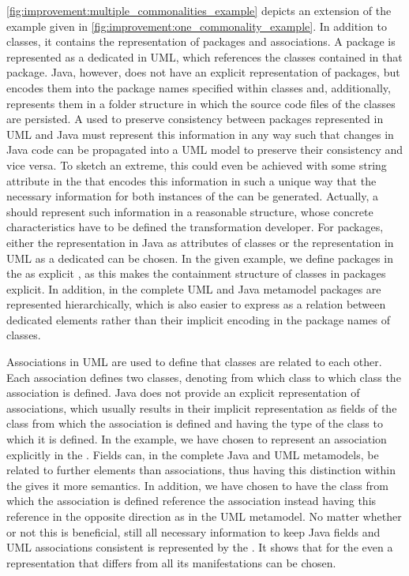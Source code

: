 \autoref{fig:improvement:multiple_commonalities_example} depicts an extension of the example given in \autoref{fig:improvement:one_commonality_example}.
In addition to classes, it contains the representation of packages and associations.
A package is represented as a dedicated \metaclass in \gls{UML}, which references the classes contained in that package.
Java, however, does not have an explicit representation of packages, but encodes them into the package names specified within classes and, additionally, represents them in a folder structure in which the source code files of the classes are persisted.
A \conceptmetamodel used to preserve consistency between packages represented in \gls{UML} and Java must represent this information in any way such that changes in Java code can be propagated into a \gls{UML} model to preserve their consistency and vice versa.
To sketch an extreme, this could even be achieved with some string attribute in the \conceptmetamodel that encodes this information in such a unique way that the necessary information for both instances of the \concretemetamodels can be generated.
Actually, a \conceptmetamodel should represent such information in a reasonable structure, whose concrete characteristics have to be defined the transformation developer.
For packages, either the representation in Java as attributes of classes or the representation in \gls{UML} as a dedicated \metaclass can be chosen.
In the given example, we define packages in the \conceptmetamodel as explicit \metaclasses, as this makes the containment structure of classes in packages explicit.
In addition, in the complete \gls{UML} and Java metamodel packages are represented hierarchically, which is also easier to express as a relation between dedicated elements rather than their implicit encoding in the package names of classes.

Associations in \gls{UML} are used to define that classes are related to each other.
Each association defines two classes, denoting from which class to which class the association is defined.
Java does not provide an explicit representation of associations, which usually results in their implicit representation as fields of the class from which the association is defined and having the type of the class to which it is defined.
In the example, we have chosen to represent an association explicitly in the \conceptmetamodel.
Fields can, in the complete Java and \gls{UML} metamodels, be related to further elements than associations, thus having this distinction within the \conceptmetamodel gives it more semantics.
In addition, we have chosen to have the class from which the association is defined reference the association instead having this reference in the opposite direction as in the \gls{UML} metamodel.
No matter whether or not this is beneficial, still all necessary information to keep Java fields and \gls{UML} associations consistent is represented by the \conceptmetamodel.
It shows that for the \conceptmetamodel even a representation that differs from all its manifestations can be chosen.

